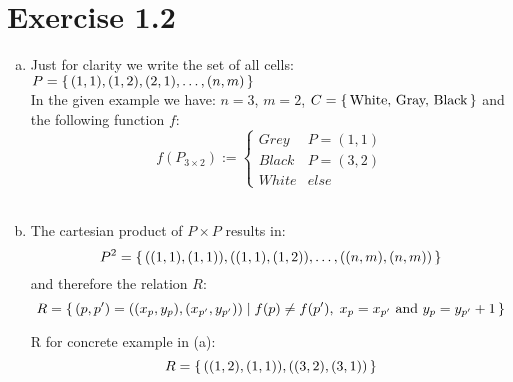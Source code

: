 \documentclass{article} %
\newcommand{\homeworkNumber}{1}
\begin{document}
\section*{Exercise \homeworkNumber.2}
\begin{enumerate}[(a)]
	\item
	Just for clarity we write the set of all cells: $P = \set{(1,1), (1,2),
	(2,1), \dots, (n,m)}$\\
	In the given example we have: $n = 3$, $m = 2$, $C = \set{\text{White, Gray,
	Black}}$ and the following function $f$:
	$$
	f(P_{3 \times 2}) :=
	\begin{cases}
		Grey & P = (1, 1)\\
		Black & P = (3, 2)\\
		White & else
	\end{cases}
	$$\\

	\item
	The cartesian product of $P \times P$ results in:
	$$P^2 = \set{((1,1), (1,1)), ((1,1), (1,2)), \dots, ((n,m), (n,m))}$$
	and therefore the relation $R$:
	$$R = \set{(p, p') = ((x_p, y_p), (x_{p'}, y_{p'})) \mid f(p) \neq f(p'),\;
	x_p = x_{p'} \text{ and } y_p = y_{p'} + 1}$$

	R for concrete example in (a):
	$$R = \set{((1,2), (1,1)), ((3,2), (3,1))}$$
\end{enumerate}

\clearpage
\end{document}
